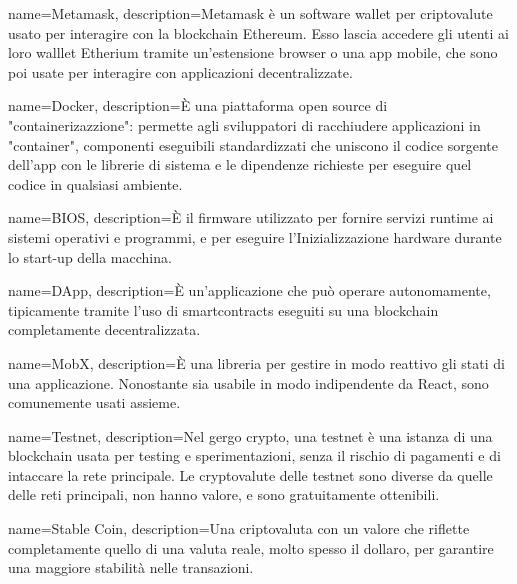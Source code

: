 {
  name={Metamask},
  description={Metamask è un software wallet per criptovalute usato per interagire con la blockchain Ethereum. Esso lascia accedere gli utenti ai loro walllet Etherium tramite un'estensione browser o una app mobile, che sono poi usate per interagire con applicazioni decentralizzate.}
}

{
  name={Docker},
  description={È una piattaforma open source di "containerizazzione": permette agli sviluppatori di racchiudere applicazioni in "container", componenti eseguibili standardizzati che uniscono il codice sorgente dell'app con le librerie di sistema e le dipendenze richieste per eseguire quel codice in qualsiasi ambiente.}
}

{
  name={BIOS},
  description={È il firmware utilizzato per fornire servizi runtime ai sistemi operativi e programmi, e per eseguire l'Inizializzazione hardware durante lo start-up della macchina.}
}

{
  name={DApp},
  description={È un'applicazione che può operare autonomamente, tipicamente tramite l'uso di smartcontracts eseguiti su una blockchain completamente decentralizzata.}
}

{
  name={MobX},
  description={È una libreria per gestire in modo reattivo gli stati di una applicazione. Nonostante sia usabile in modo indipendente da React, sono comunemente usati assieme.}
}

{
  name={Testnet},
  description={Nel gergo crypto, una testnet è una istanza di una blockchain usata per testing e sperimentazioni, senza il rischio di pagamenti e di intaccare la rete principale. Le cryptovalute delle testnet sono diverse da quelle delle reti principali, non hanno valore, e sono gratuitamente ottenibili.}
}

{
  name={Stable Coin},
  description={Una criptovaluta con un valore che riflette completamente quello di una valuta reale, molto spesso il dollaro, per garantire una maggiore stabilità nelle transazioni.}
}